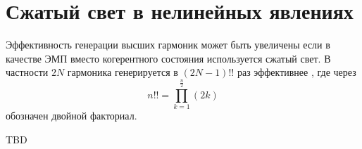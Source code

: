 \section{Сжатый свет в нелинейных явлениях}
Эффективность генерации высших гармоник может быть увеличены если в
качестве ЭМП вместо когерентного состояния используется сжатый свет. В
частности $2N$ гармоника генерируется в $(2N-1)!!$
раз эффективнее \cite[с. 72-76]{bBykov}, где через
\[
n!! = \prod_{k=1}^{\frac{n}{2}}(2k)
\] обозначен двойной факториал.

TBD
